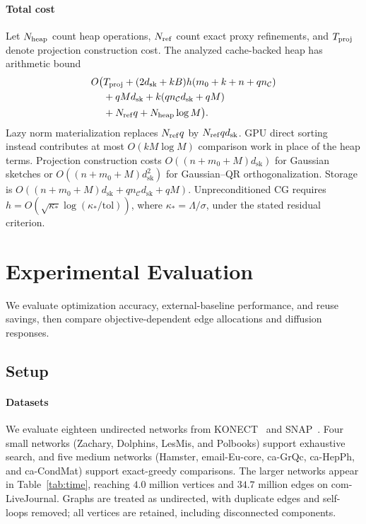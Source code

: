 \documentclass[conference]{IEEEtran}
\theoremstyle{definition}
\newcommand{\dsk}{d_{\mathrm{sk}}}
\begin{document}
\paragraph{Total cost}
Let $N_{\rm heap}$ count heap operations, $N_{\rm ref}$ count exact
proxy refinements, and $T_{\rm proj}$ denote projection construction
cost. The analyzed cache-backed heap has arithmetic bound
\begin{equation}
\begin{split}
O\bigl(&T_{\rm proj}+(2\dsk+kB)h(m_0+k+n+qn_{\mathcal C})\\
&+qM\dsk+k(qn_{\mathcal C}\dsk+qM)\\
&+N_{\rm ref}q+N_{\rm heap}\log M\bigr).
\end{split}
\label{eq:total-complexity}
\end{equation}
Lazy norm materialization replaces $N_{\rm ref}q$ by
$N_{\rm ref}q\dsk$. GPU direct sorting instead contributes at most
$O(kM\log M)$ comparison work in place of the heap terms.
Projection construction costs $O((n+m_0+M)\dsk)$ for Gaussian
sketches or $O((n+m_0+M)\dsk^2)$ for Gaussian--QR orthogonalization.
Storage is $O((n+m_0+M)\dsk+qn_{\mathcal C}\dsk+qM)$.
Unpreconditioned CG requires
$h=O(\sqrt{\kappa_*}\log(\kappa_*/\mathrm{tol}))$, where
$\kappa_*=\Lambda/\sigma$, under the stated residual criterion.


\section{Experimental Evaluation}
\label{sec:experiments}

We evaluate optimization accuracy, external-baseline performance,
and reuse savings, then compare objective-dependent edge allocations
and diffusion responses.

\subsection{Setup}

\paragraph{Datasets}
We evaluate eighteen undirected networks from KONECT~\cite{konect}
and SNAP~\cite{snap}. Four small networks (Zachary, Dolphins, LesMis,
and Polbooks) support exhaustive search, and five medium networks
(Hamster, email-Eu-core, ca-GrQc, ca-HepPh, and ca-CondMat) support
exact-greedy comparisons. The larger networks appear in
Table~\ref{tab:time}, reaching $4.0$ million vertices and $34.7$ million
edges on com-LiveJournal. Graphs are treated as undirected, with duplicate
edges and self-loops removed; all vertices are retained, including
disconnected components.
\end{document}
